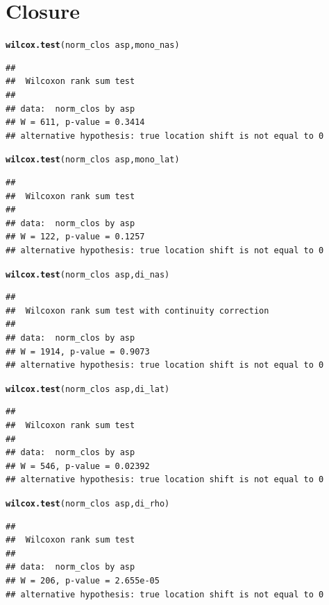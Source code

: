 \documentclass[a4paper,11pt]{article}\usepackage[]{graphicx}\usepackage[]{color}
\makeatletter
\newcommand{\hlopt}[1]{\textcolor[rgb]{0,0,0}{#1}}%
\newcommand{\hlstd}[1]{\textcolor[rgb]{0.345,0.345,0.345}{#1}}%
\newcommand{\hlkwd}[1]{\textcolor[rgb]{0.737,0.353,0.396}{\textbf{#1}}}%
\newenvironment{kframe}{%
 \def\at@end@of@kframe{}%
 \ifinner\ifhmode%
  \def\at@end@of@kframe{\end{minipage}}%
  \begin{minipage}{\columnwidth}%
 \fi\fi%
 \def\FrameCommand##1{\hskip\@totalleftmargin \hskip-\fboxsep
 \colorbox{shadecolor}{##1}\hskip-\fboxsep
     \hskip-\linewidth \hskip-\@totalleftmargin \hskip\columnwidth}%
 \MakeFramed {\advance\hsize-\width
   \@totalleftmargin\z@ \linewidth\hsize
   \@setminipage}}%
 {\par\unskip\endMakeFramed%
 \at@end@of@kframe}
\newenvironment{knitrout}{}{} %
\makeatother
\begin{document}
\section{Closure}
\begin{knitrout}
\color{fgcolor}\begin{kframe}
\begin{alltt}
\hlkwd{wilcox.test}\hlstd{(norm_clos} \hlopt{~} \hlstd{asp, mono_nas)}
\end{alltt}
\begin{verbatim}
## 
## 	Wilcoxon rank sum test
## 
## data:  norm_clos by asp
## W = 611, p-value = 0.3414
## alternative hypothesis: true location shift is not equal to 0
\end{verbatim}
\begin{alltt}
\hlkwd{wilcox.test}\hlstd{(norm_clos} \hlopt{~} \hlstd{asp, mono_lat)}
\end{alltt}
\begin{verbatim}
## 
## 	Wilcoxon rank sum test
## 
## data:  norm_clos by asp
## W = 122, p-value = 0.1257
## alternative hypothesis: true location shift is not equal to 0
\end{verbatim}
\begin{alltt}
\hlkwd{wilcox.test}\hlstd{(norm_clos} \hlopt{~} \hlstd{asp, di_nas)}
\end{alltt}
\begin{verbatim}
## 
## 	Wilcoxon rank sum test with continuity correction
## 
## data:  norm_clos by asp
## W = 1914, p-value = 0.9073
## alternative hypothesis: true location shift is not equal to 0
\end{verbatim}
\begin{alltt}
\hlkwd{wilcox.test}\hlstd{(norm_clos} \hlopt{~} \hlstd{asp, di_lat)}
\end{alltt}
\begin{verbatim}
## 
## 	Wilcoxon rank sum test
## 
## data:  norm_clos by asp
## W = 546, p-value = 0.02392
## alternative hypothesis: true location shift is not equal to 0
\end{verbatim}
\begin{alltt}
\hlkwd{wilcox.test}\hlstd{(norm_clos} \hlopt{~} \hlstd{asp, di_rho)}
\end{alltt}
\begin{verbatim}
## 
## 	Wilcoxon rank sum test
## 
## data:  norm_clos by asp
## W = 206, p-value = 2.655e-05
## alternative hypothesis: true location shift is not equal to 0
\end{verbatim}
\end{kframe}
\end{knitrout}
\end{document}

